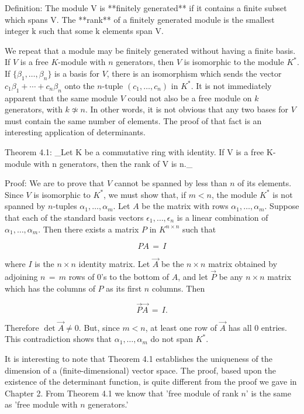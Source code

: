 Definition: The module \(\mathrm{V}\) is **finitely generated** if it contains a finite subset which spans \(\mathrm{V}\). The **rank** of a finitely generated module is the smallest integer \(\mathrm{k}\) such that some \(\mathrm{k}\) elements span \(\mathrm{V}\).

We repeat that a module may be finitely generated without having a finite basis. If \(V\) is a free \(K\)-module with \(n\) generators, then \(V\) is isomorphic to the module \(K^{*}\). If \(\{\beta_{1},\ldots,\beta_{n}\}\) is a basis for \(V\), there is an isomorphism which sends the vector \(c_{1}\beta_{1}+\cdots+c_{n}\beta_{n}\) onto the \(n\)-tuple \((c_{1},\ldots,c_{n})\) in \(K^{*}\). It is not immediately apparent that the same module \(V\) could not also be a free module on \(k\) generators, with \(k\not\simeq n\). In other words, it is not obvious that any two bases for \(V\) must contain the same number of elements. The proof of that fact is an interesting application of determinants.

Theorem 4.1: _Let \(\mathrm{K}\) be a commutative ring with identity. If \(\mathrm{V}\) is a free \(\mathrm{K}\)-module with \(\mathrm{n}\) generators, then the rank of \(\mathrm{V}\) is \(\mathrm{n}\)._

Proof: We are to prove that \(V\) cannot be spanned by less than \(n\) of its elements. Since \(V\) is isomorphic to \(K^{*}\), we must show that, if \(m<n\), the module \(K^{*}\) is not spanned by \(n\)-tuples \(\alpha_{1},\ldots,\alpha_{m}\). Let \(A\) be the matrix with rows \(\alpha_{1},\ldots,\alpha_{m}\). Suppose that each of the standard basis vectors \(\epsilon_{1},\ldots,\epsilon_{n}\) is a linear combination of \(\alpha_{1},\ldots,\alpha_{m}\). Then there exists a matrix \(P\) in \(K^{n\times n}\) such that

\[PA\,=\,I\]

where \(I\) is the \(n\times n\) identity matrix. Let \(\vec{A}\) be the \(n\times n\) matrix obtained by adjoining \(n\,=\,m\) rows of \(0\)'s to the bottom of \(A\), and let \(\vec{P}\) be any \(n\times n\) matrix which has the columns of \(P\) as its first \(n\) columns. Then

\[\vec{P}\vec{A}\,=\,I.\]

Therefore \(\det\vec{A}\neq 0\). But, since \(m<n\), at least one row of \(\vec{A}\) has all \(0\) entries. This contradiction shows that \(\alpha_{1},\ldots,\alpha_{m}\) do not span \(K^{*}\).

It is interesting to note that Theorem 4.1 establishes the uniqueness of the dimension of a (finite-dimensional) vector space. The proof, based upon the existence of the determinant function, is quite different from the proof we gave in Chapter 2. From Theorem 4.1 we know that 'free module of rank \(n\)' is the same as 'free module with \(n\) generators.'

